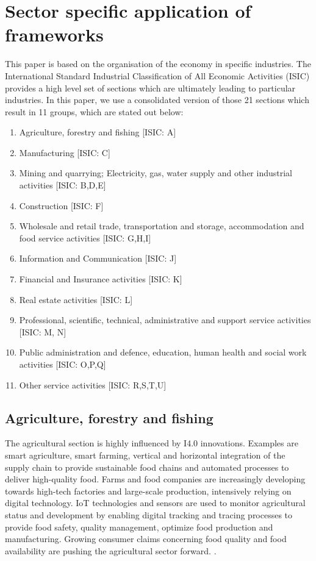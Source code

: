 \section{Sector specific application of frameworks}

This paper is based on the organisation of the economy in specific industries. The International Standard Industrial Classification of All Economic Activities (\ac{ISIC}) provides a high level set of sections which are ultimately leading to particular industries. In this paper, we use a consolidated version of those 21 sections which result in 11 groups, which are stated out below: \cite[p.271, table 4]{ISIC:2008}

\begin{enumerate}
\item Agriculture, forestry and fishing [ISIC: A]
\item Manufacturing [ISIC: C]
\item Mining and quarrying; Electricity, gas, water supply and other industrial activities [ISIC: B,D,E]
\item Construction [ISIC: F]
\item Wholesale and retail trade, transportation and storage, accommodation and food service activities [ISIC: G,H,I]
\item Information and Communication [ISIC: J]
\item Financial and Insurance activities [ISIC: K]
\item Real estate activities [ISIC: L]
\item Professional, scientific, technical, administrative and support service activities [ISIC: M, N]
\item Public administration and defence, education, human health and social work activities [ISIC: O,P,Q]
\item Other service activities [ISIC: R,S,T,U]
\end{enumerate}

\subsection{Agriculture, forestry and fishing}

The agricultural section is highly influenced by \ac{I4.0} innovations. Examples are smart agriculture, smart farming, vertical and horizontal integration of the supply chain to provide sustainable food chains and automated processes to deliver high-quality food. Farms and food companies are increasingly developing towards high-tech factories and large-scale production, intensively relying on digital technology. \cite[p.129-151]{FoodAndFarm2020} \ac{IoT} technologies and sensors are used to monitor agricultural status and development by enabling digital tracking and tracing processes to provide food safety, quality management, optimize food production and manufacturing. Growing consumer claims concerning food quality and food availability are pushing the agricultural sector forward. \cite[p.131]{FoodAndFarm2020}.


